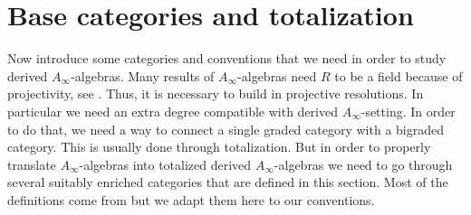 \documentclass[Thesis.tex]{subfiles}
\begin{document}





\section{Base categories and totalization}\label{categories}




Now introduce some categories and conventions that we need in order to study derived $A_\infty$-algebras. Many results of $A_\infty$-algebras need $R$ to be a field because of projectivity, see . Thus, it is necessary to build in projective resolutions. In particular we need an extra degree compatible with derived $A_\infty$-setting. In order to do that, we need a way to connect a single graded category with a bigraded category. This is usually done through totalization. But in order to properly translate $A_\infty$-algebras into totalized derived $A_\infty$-algebras we need to go through several suitably enriched categories that are defined in this section. Most of the definitions come from \cite[\S 2]{whitehouse} but we adapt them here to our conventions.
\end{document}
